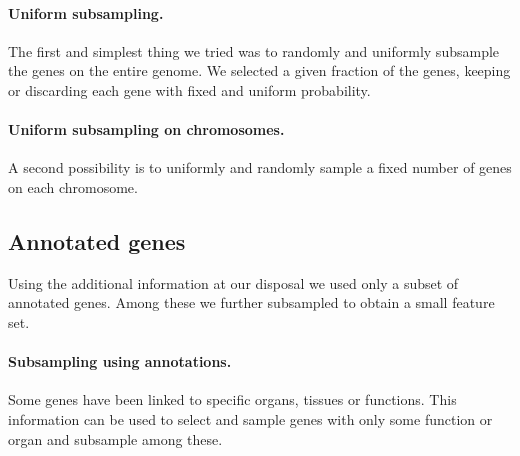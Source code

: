 \paragraph{Uniform subsampling.}
The first and simplest thing we tried was to randomly and uniformly subsample the genes on the entire genome.
We selected a given fraction of the genes, keeping or discarding each gene with fixed and uniform probability.

\paragraph{Uniform subsampling on chromosomes.}
A second possibility is to uniformly and randomly sample a fixed number of genes on each chromosome.

\subsection{Annotated genes}
Using the additional information at our disposal we used only a subset of annotated genes. Among these we further subsampled to obtain a small feature set.

\paragraph{Subsampling using annotations.}
Some genes have been linked to specific organs, tissues or functions. This information can be used to select and sample genes with only some function or organ and subsample among these.
